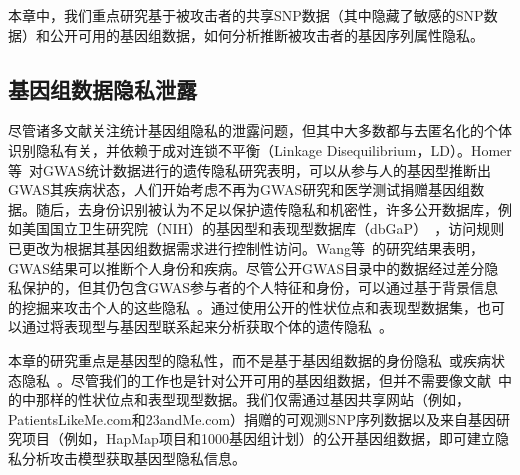 本章中，我们重点研究基于被攻击者的共享SNP数据（其中隐藏了敏感的SNP数据）和公开可用的基因组数据，如何分析推断被攻击者的基因序列属性隐私。

\subsection{基因组数据隐私泄露}

尽管诸多文献关注统计基因组隐私的泄露问题，但其中大多数都与去匿名化的个体识别隐私有关，并依赖于成对连锁不平衡（Linkage Disequilibrium，LD）。Homer等~\cite{homer2008resolving}对GWAS统计数据进行的遗传隐私研究表明，可以从参与人的基因型推断出GWAS其疾病状态，人们开始考虑不再为GWAS研究和医学测试捐赠基因组数据。随后，去身份识别被认为不足以保护遗传隐私和机密性，许多公开数据库，例如美国国立卫生研究院（NIH）的基因型和表现型数据库（dbGaP）~\cite{mailman2007ncbi,nhgri2015privacy}，访问规则已更改为根据其基因组数据需求进行控制性访问。Wang等~\cite{wang2009learning}的研究结果表明，GWAS结果可以推断个人身份和疾病。尽管公开GWAS目录中的数据经过差分隐私保护的，但其仍包含GWAS参与者的个人特征和身份，可以通过基于背景信息的挖掘来攻击个人的这些隐私~\cite{wang2016infringement}。通过使用公开的性状位点和表现型数据集，也可以通过将表现型与基因型联系起来分析获取个体的遗传隐私~\cite{harmanci2016quantification}。

本章的研究重点是基因型的隐私性，而不是基于基因组数据的身份隐私~\cite{wang2009learning,wang2016infringement}或疾病状态隐私~\cite{homer2008resolving,wang2009learning}。尽管我们的工作也是针对公开可用的基因组数据，但并不需要像文献~\cite{wang2009learning,wang2016infringement,harmanci2016quantification}中的中那样的性状位点和表型现型数据。我们仅需通过基因共享网站（例如，PatientsLikeMe.com和23andMe.com）捐赠的可观测SNP序列数据以及来自基因研究项目（例如，HapMap项目和1000基因组计划）的公开基因组数据，即可建立隐私分析攻击模型获取基因型隐私信息。

